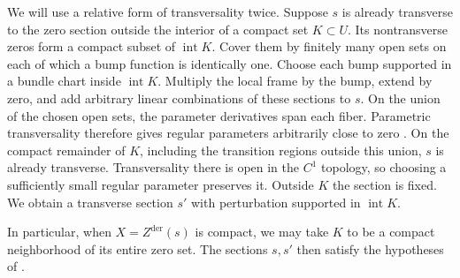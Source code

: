 
We will use a relative form of transversality twice. Suppose $s$ is already
transverse to the zero section outside the interior of a compact set
$K\subset U$. Its nontransverse zeros form a compact subset of
$\operatorname{int}K$. Cover them by finitely many open sets on each of
which a bump function is identically one. Choose each bump supported in
a bundle chart inside $\operatorname{int}K$. Multiply the local frame by
the bump, extend by zero, and add arbitrary linear combinations of these
sections to $s$. On the union of the chosen open sets, the parameter
derivatives span each fiber. Parametric transversality therefore gives
regular parameters arbitrarily close to zero
\cite[Chapter~3, \S2, Theorem~2.7]{Hirsch_Differential_Topology}.
On the compact remainder of $K$, including the transition regions outside
this union, $s$ is already transverse. Transversality there is open in
the $C^1$ topology, so choosing a sufficiently small regular parameter
preserves it. Outside $K$ the section is fixed. We obtain a transverse
section $s'$ with perturbation supported in $\operatorname{int}K$.

In particular, when $X=Z^{\mathrm{der}}(s)$ is compact, we may take $K$
to be a compact neighborhood of its entire zero set. The sections $s,s'$
then satisfy the hypotheses of .

